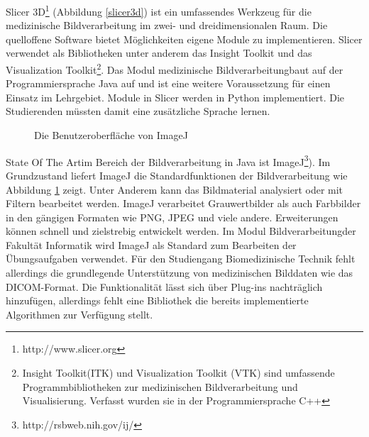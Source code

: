 Slicer 3D\footnote{http://www.slicer.org} (Abbildung \ref{slicer3d}) ist ein umfassendes Werkzeug für die medizinische Bildverarbeitung im zwei- und dreidimensionalen Raum. Die quelloffene Software bietet Möglichkeiten eigene Module zu implementieren. Slicer verwendet als Bibliotheken unter anderem das Insight Toolkit und das Visualization Toolkit\footnote{Insight Toolkit(ITK) und Visualization Toolkit (VTK) sind umfassende Programmbibliotheken zur medizinischen Bildverarbeitung und Visualisierung. Verfasst wurden sie in der Programmiersprache C++}. Das Modul \glqq medizinische Bildverarbeitung\grqq baut auf der Programmiersprache Java auf und ist eine weitere Voraussetzung für einen Einsatz im Lehrgebiet. Module in Slicer werden in Python implementiert. Die Studierenden müssten damit eine zusätzliche Sprache lernen.\\

\begin{figure}[htbp]
  \vspace{0.5cm}
  \centering
  \caption{Die Benutzeroberfläche von ImageJ}
  \label{imagej}
  \vspace{0.5cm}
\end{figure}

\glqq State Of The Art\grqq im Bereich der Bildverarbeitung in Java ist ImageJ\footnote{http://rsbweb.nih.gov/ij/}). Im Grundzustand liefert ImageJ die Standardfunktionen der Bildverarbeitung wie Abbildung \ref{imagej} zeigt. Unter Anderem kann das Bildmaterial analysiert oder mit Filtern bearbeitet werden. ImageJ verarbeitet Grauwertbilder als auch Farbbilder in den gängigen Formaten wie PNG, JPEG und viele andere. Erweiterungen können schnell und zielstrebig entwickelt werden. Im Modul \glqq Bildverarbeitung\grqq der Fakultät Informatik wird ImageJ als Standard zum Bearbeiten der Übungsaufgaben verwendet. Für den Studiengang Biomedizinische Technik fehlt allerdings die grundlegende Unterstützung von medizinischen Bilddaten wie das DICOM-Format. Die Funktionalität lässt sich über Plug-ins nachträglich hinzufügen, allerdings fehlt eine Bibliothek die bereits implementierte Algorithmen zur Verfügung stellt.

